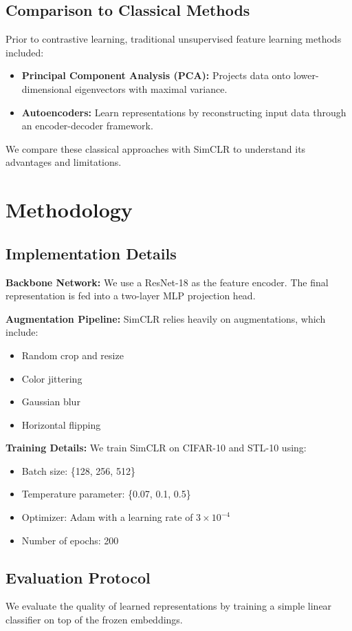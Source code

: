 \documentclass[11pt]{article}
\begin{document}
\subsection{Comparison to Classical Methods}
Prior to contrastive learning, traditional unsupervised feature learning methods included:
\begin{itemize}
  \item \textbf{Principal Component Analysis (PCA):} Projects data onto lower-dimensional eigenvectors
with maximal variance.
  \item \textbf{Autoencoders:} Learn representations by reconstructing input data through an encoder-decoder
framework.
\end{itemize}
We compare these classical approaches with SimCLR to understand its advantages and limitations.

\section{Methodology}

\subsection{Implementation Details}
\textbf{Backbone Network:} We use a ResNet-18 as the feature encoder. The final representation is fed into
a two-layer MLP projection head.

\textbf{Augmentation Pipeline:} SimCLR relies heavily on augmentations, which include:
\begin{itemize}
  \item Random crop and resize
  \item Color jittering
  \item Gaussian blur
  \item Horizontal flipping
\end{itemize}

\textbf{Training Details:} We train SimCLR on CIFAR-10 and STL-10 using:
\begin{itemize}
  \item Batch size: \{128, 256, 512\}
  \item Temperature parameter: \{0.07, 0.1, 0.5\}
  \item Optimizer: Adam with a learning rate of $3 \times 10^{-4}$
  \item Number of epochs: 200
\end{itemize}

\subsection{Evaluation Protocol}
We evaluate the quality of learned representations by training a simple linear classifier on top of the
frozen embeddings.
\end{document}
